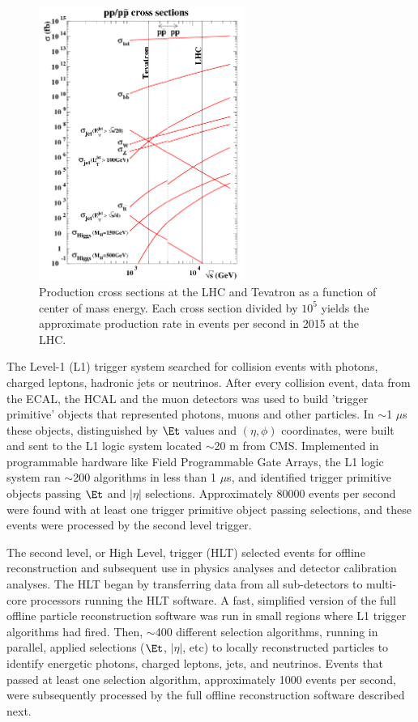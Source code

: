 \begin{figure}[h]
	\centering
	\includegraphics[width=0.6\textwidth]{figures/lhc_and_tevatron_cross_sections_2006.png}
	\caption{Production cross sections at the LHC and Tevatron as a function of center of mass energy.  Each cross section divided by $10^{5}$ yields 
	the approximate production rate in events per second in 2015 at the LHC.}
	\label{fig:smProductionXsxns}
\end{figure}

The Level-1 (L1) trigger system searched for collision events with photons, charged leptons, hadronic 
jets or neutrinos.  After every collision event, data from the ECAL, the HCAL and the muon detectors was used to build 'trigger 
primitive' objects that represented photons, muons and other particles.  In $\sim$1 $\mu$s these objects, 
distinguished by $\Et$ values and $(\eta, \phi)$ coordinates, were built and sent to the L1 logic system located 
$\sim$20 m from CMS.  Implemented in programmable hardware like Field Programmable Gate Arrays, the L1 
logic system ran $\sim$200 algorithms in less than 1 $\mu$s, and identified trigger primitive objects passing $\Et$ 
and $|\eta|$ selections.  Approximately 80000 events per second were found with at least one trigger 
primitive object passing selections, and these events were processed by the second level trigger.  

The second level, or High Level, trigger (HLT) selected events for offline reconstruction and subsequent 
use in physics analyses and detector calibration analyses.  The HLT began by transferring data from all 
sub-detectors to multi-core processors running the HLT software.  
A fast, simplified version of the full offline particle reconstruction software was run in small 
regions where L1 trigger algorithms had fired.  Then, $\sim$400 different selection algorithms, running in 
parallel, applied selections ($\Et$, $|\eta|$, etc) to locally reconstructed particles 
to identify energetic photons, charged leptons, jets, and neutrinos.  Events that passed at least one selection 
algorithm, approximately 1000 events per second, were subsequently processed by the full offline reconstruction 
software described next.


